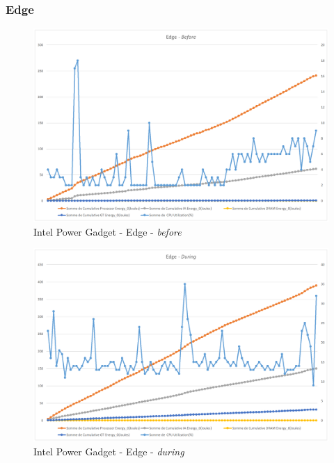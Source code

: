 \documentclass[12pt, a4paper]{report}
\begin{document}
\subsubsection{Edge}
\begin{figure}[H]
    \includegraphics[width=1\linewidth]{res//graph/IntelPowerGadget/edge-before.png}
    \caption{Intel Power Gadget - Edge - \textit{before}}
    \label{fig:ipg_edge-before}
\end{figure}
\begin{figure}[H]
    \includegraphics[width=1\linewidth]{res//graph/IntelPowerGadget/edge-during.png}
    \caption{Intel Power Gadget - Edge - \textit{during}}
    \label{fig:ipg_edge-during}
\end{figure}
\end{document}
